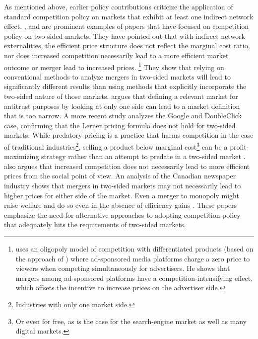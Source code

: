 \documentclass[12pt,a4paper,notitlepage]{article}
\begin{document}
As mentioned above, earlier policy contributions criticize the application of standard competition policy on markets that exhibit at least one indirect network effect. \citet{evans_antitrust_2003}, \citet{evans_industrial_2007} \citet{wright_onesided_2004} and \citet{kaiser_price_2006} are prominent examples of papers that have focused on competition policy on two-sided markets. They have pointed out that with indirect network externalities, the efficient price structure does not reflect the marginal cost ratio, nor does increased competition necessarily lead to a more efficient market outcome or merger lead to increased prices. \footnote{\citet{malam_mergers_2011} uses an oligopoly model of competition with differentiated products (based on the approach of \citet{salop_monopolistic_1979}) where ad-sponsored media platforms charge a zero price to viewers when competing simultaneously for advertisers. He shows that mergers among ad-sponsored platforms have a competition-intensifying effect, which offsets the incentive to increase prices on the advertiser side.} They show that relying on conventional methods to analyze mergers in two-sided markets will lead to significantly different results than using methods that explicitly incorporate the two-sided nature of those markets. \citet{evans_antitrust_2003} argues that defining a relevant market for antitrust purposes by looking at only one side can lead to a market definition that is too narrow. A more recent study \citet{evans_analysis_2008} analyzes the Google and DoubleClick case, confirming that the Lerner pricing formula does not hold for two-sided markets. While predatory pricing is a practice that harms competition in the case of traditional industries\footnote{Industries with only one market side.}, selling a product below marginal cost\footnote{Or even for free, as is the case for the search-engine market as well as many digital markets.} can be a profit-maximizing strategy rather than an attempt to predate in a two-sided market \citep{wright_onesided_2004}. \citet{wright_onesided_2004} also argues that increased competition does not necessarily lead to more efficient prices from the social point of view. An analysis of the Canadian newspaper industry shows that mergers in two-sided markets may not necessarily lead to higher prices for either side of the market. Even a merger to monopoly might raise welfare and do so even in the absence of efficiency gains \citep{leonello_horizontal_2010}. These papers emphasize the need for alternative approaches to adopting competition policy that adequately hits the requirements of two-sided markets. 
\end{document}
